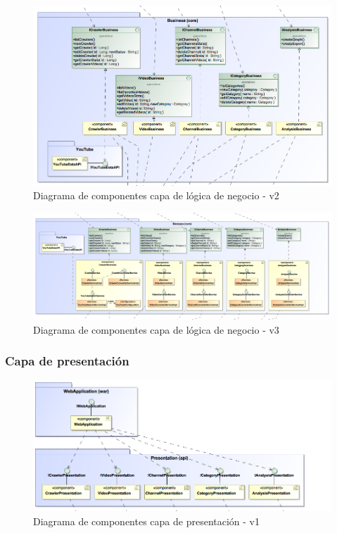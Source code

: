 \documentclass[11pt,a4paper]{article}
\begin{document}
\begin{figure}[H]
\centering
\includegraphics[scale=0.3]{diseno/negocio/ComponentDiagram2.png}
\caption{Diagrama de componentes capa de lógica de negocio - v2}
\end{figure}

\begin{figure}[H]
\centering
\includegraphics[scale=0.25]{diseno/negocio/ComponentDiagram3.png}
\caption{Diagrama de componentes capa de lógica de negocio - v3}
\end{figure}

\medskip 

\subsubsection{Capa de presentación}

\begin{figure}[H]
\centering
\includegraphics[scale=0.35]{diseno/presentacion/ComponentsDiagram.png}
\caption{Diagrama de componentes capa de presentación - v1}
\end{figure}
\end{document}
